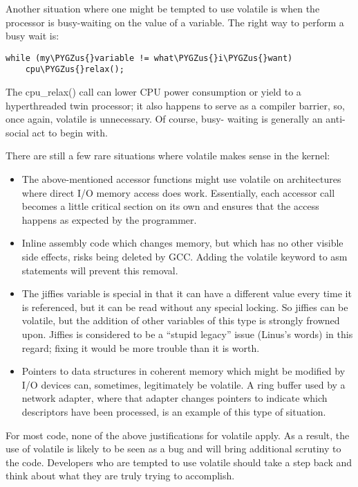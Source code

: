 \documentclass[a4paper,8pt,english]{sphinxmanual}
\def\PYGZus{\char`\_}
\begin{document}
Another situation where one might be tempted to use volatile is
when the processor is busy-waiting on the value of a variable.  The right
way to perform a busy wait is:

\begin{Verbatim}[commandchars=\\\{\}]
while (my\PYGZus{}variable != what\PYGZus{}i\PYGZus{}want)
    cpu\PYGZus{}relax();
\end{Verbatim}

The cpu\_relax() call can lower CPU power consumption or yield to a
hyperthreaded twin processor; it also happens to serve as a compiler
barrier, so, once again, volatile is unnecessary.  Of course, busy-
waiting is generally an anti-social act to begin with.

There are still a few rare situations where volatile makes sense in the
kernel:
\begin{itemize}
\item {} 
The above-mentioned accessor functions might use volatile on
architectures where direct I/O memory access does work.  Essentially,
each accessor call becomes a little critical section on its own and
ensures that the access happens as expected by the programmer.

\item {} 
Inline assembly code which changes memory, but which has no other
visible side effects, risks being deleted by GCC.  Adding the volatile
keyword to asm statements will prevent this removal.

\item {} 
The jiffies variable is special in that it can have a different value
every time it is referenced, but it can be read without any special
locking.  So jiffies can be volatile, but the addition of other
variables of this type is strongly frowned upon.  Jiffies is considered
to be a ``stupid legacy'' issue (Linus's words) in this regard; fixing it
would be more trouble than it is worth.

\item {} 
Pointers to data structures in coherent memory which might be modified
by I/O devices can, sometimes, legitimately be volatile.  A ring buffer
used by a network adapter, where that adapter changes pointers to
indicate which descriptors have been processed, is an example of this
type of situation.

\end{itemize}

For most code, none of the above justifications for volatile apply.  As a
result, the use of volatile is likely to be seen as a bug and will bring
additional scrutiny to the code.  Developers who are tempted to use
volatile should take a step back and think about what they are truly trying
to accomplish.
\end{document}
